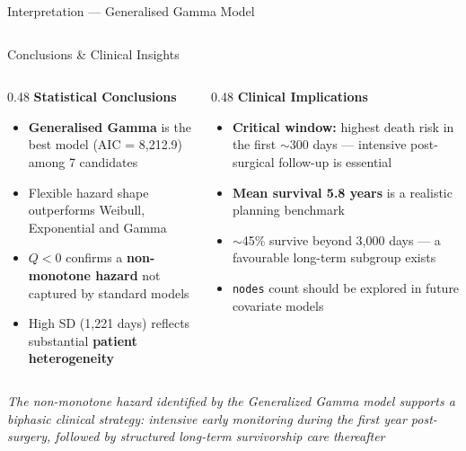 \documentclass[aspectratio=169, 11pt]{beamer}
\begin{document}
\begin{frame}{Interpretation --- Generalised Gamma Model}
\begin{columns}[T]
\end{columns}
\end{frame}

\begin{frame}{Conclusions \& Clinical Insights}

\begin{columns}[T]

  \begin{column}{0.48\textwidth}
    \textbf{Statistical Conclusions}
    \vspace{3pt}
    \begin{itemize}
      \small
      \item \textbf{Generalised Gamma} is the best model
            (AIC = 8{,}212.9) among 7 candidates
      \item Flexible hazard shape outperforms Weibull,
            Exponential and Gamma
      \item $Q{<}0$ confirms a \textbf{non-monotone hazard}
            not captured by standard models
      \item High SD (1{,}221 days) reflects substantial
            \textbf{patient heterogeneity}
    \end{itemize}
  \end{column}

  \begin{column}{0.48\textwidth}
    \textbf{Clinical Implications}
    \vspace{3pt}
    \begin{itemize}
      \small
      \item \textbf{Critical window:} highest death risk
            in the first $\sim$300 days --- intensive
            post-surgical follow-up is essential
      \item \textbf{Mean survival 5.8 years} is a
            realistic planning benchmark
      \item $\sim$45\% survive beyond 3{,}000 days ---
            a favourable long-term subgroup exists
      \item \texttt{nodes} count should be explored
            in future covariate models
    \end{itemize}
  \end{column}

\end{columns}

\vspace{6pt}
\begin{center}
  \small\itshape
  The non-monotone hazard identified by the Generalized Gamma model supports a biphasic clinical strategy: intensive early monitoring during the first year post-surgery, followed by structured long-term survivorship care thereafter
\end{center}

\end{frame}
\end{document}
